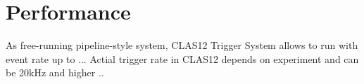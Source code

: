\section{Performance}

As free-running pipeline-style system, CLAS12 Trigger System allows to run with event rate up to ...
Actial trigger rate in CLAS12 depends on experiment and can be 20kHz and higher ..

